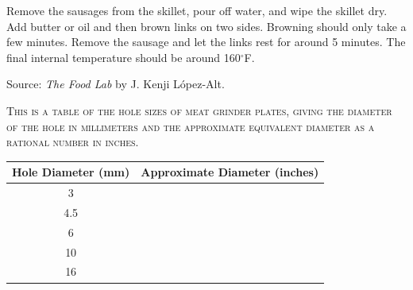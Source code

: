 \documentclass[letterpaper]{recipePMG}
\renewcommand{\deg}{$^\circ$}
\newcommand{\eighth}{\nicefrac{1}{8} \,}
\newcommand{\quarter}{\nicefrac{1}{4} \,}
\newcommand{\threeeights}{\nicefrac{3}{8} \,}
\newcommand{\half}{\nicefrac{1}{2} \,}
\newcommand{\threesixteenths}{\nicefrac{3}{16} \,}
\newcommand{\fiveeights}{\nicefrac{5}{8} \,}
\begin{document}
 Remove the sausages from the skillet, pour off water, and wipe the skillet dry.  Add butter or oil and then brown links on two sides.  Browning should only take a few minutes.  Remove the sausage and let the links rest for around 5 minutes.  The final internal temperature should be around 160\deg F.

Source: \textit{The Food Lab} by J. Kenji L\'{o}pez-Alt.

\newpage

\label{GrinderPlateSizes}
\textsc{This is a table of the hole sizes of meat grinder plates, giving the diameter of the hole in millimeters and the approximate equivalent diameter as a rational number in inches.}

\begin{table}[H]
    \centering
    \begin{tabular}{@{}cc@{}}
        \toprule
     Hole Diameter (mm) & Approximate Diameter (inches) \\
        \midrule
		3  &  \eighth\\
        4.5  &  \threesixteenths\\
        6  &  \quarter\\
        10  &  \threeeights\\
        16  &  \fiveeights
\end{tabular}
 
\end{table}
 
\end{document}
